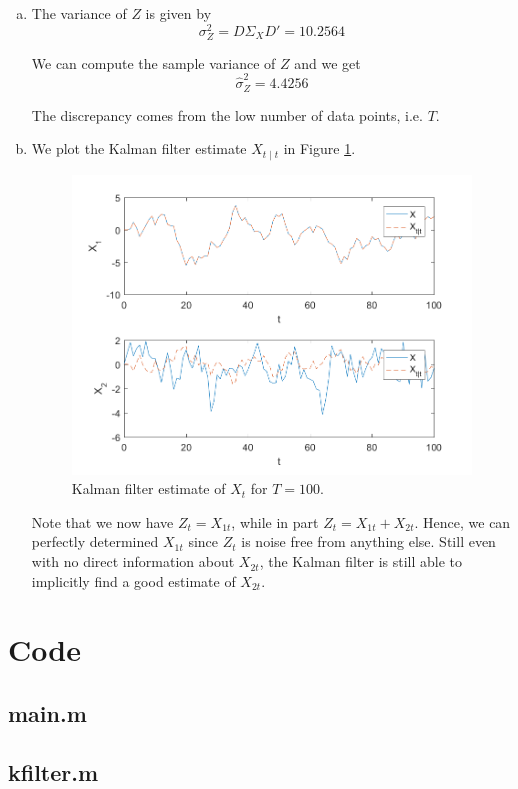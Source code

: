 \documentclass[12pt]{article}
\theoremstyle{definition}
\begin{document}
\begin{enumerate}[(a)]
\begin{enumerate}[(a)]
		\item
		
	The variance of $Z$ is given by
		\[
		\sigma^2_Z = D\Sigma_XD' =10.2564
		\]
		
		We can compute the sample variance of $Z$ and we get
		\[
		\hat{\sigma}_Z^2 = 4.4256
		\]
		
		The discrepancy comes from the low number of data points, i.e. $T$.
		
		\item
		
		We plot the Kalman filter estimate $X_{t\mid t}$ in Figure \ref{fig:plotf}.
		\begin{figure}[H]
			\centering
			\includegraphics[width=.9\linewidth]{plot_f}
		\caption{Kalman filter estimate of $X_t$ for $T=100$.}
			\label{fig:plotf}
		\end{figure}
	
		Note that we now have $Z_t=X_{1t}$, while in part $Z_t=X_{1t}+X_{2t}$. Hence, we can perfectly determined $X_{1t}$ since $Z_t$ is noise free from anything else. Still even with no direct information about $X_{2t}$, the Kalman filter is still able to implicitly find a good estimate of $X_{2t}$.
	\end{enumerate}
\end{enumerate}

\section*{Code}\label{code}
\subsection*{main.m}

\subsection*{kfilter.m}

\end{document}
